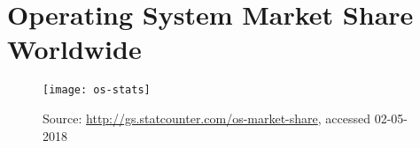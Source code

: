 \section{Operating System Market Share Worldwide}
\begin{figure}[H]
    \centering
    \texttt{[image: os-stats]}
    \caption{Source: \url{http://gs.statcounter.com/os-market-share}, accessed 02-05-2018}
    \label{fig:os-stats}
\end{figure}
\restoregeometry